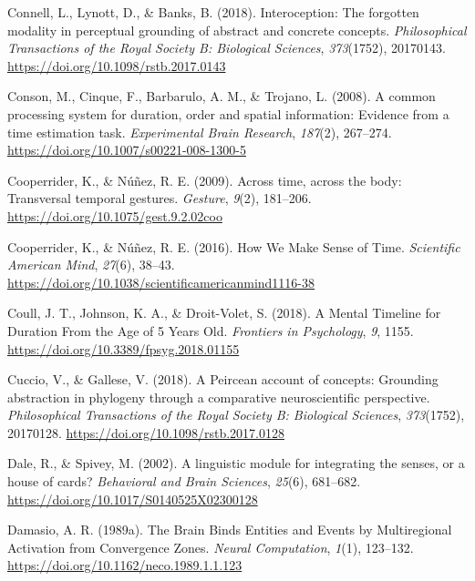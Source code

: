 \documentclass[
  a4paper,12pt,twoside,onecolumn,openright,final,oldfontcommands]{memoir}
\newlength{\cslhangindent}
\newlength{\cslentryspacingunit} %
\newenvironment{CSLReferences}[2] %
 {%
  \setlength{\parindent}{0pt}
  \ifodd #1
  \let\oldpar\par
  \def\par{\hangindent=\cslhangindent\oldpar}
  \fi
  \setlength{\parskip}{#2\cslentryspacingunit}
 }%
 {}
\begin{document}
\begin{CSLReferences}{1}{0}
\leavevmode{}%
Connell, L., Lynott, D., \& Banks, B. (2018). Interoception: The forgotten modality in perceptual grounding of abstract and concrete concepts. \emph{Philosophical Transactions of the Royal Society B: Biological Sciences}, \emph{373}(1752), 20170143. \url{https://doi.org/10.1098/rstb.2017.0143}

\leavevmode{}%
Conson, M., Cinque, F., Barbarulo, A. M., \& Trojano, L. (2008). A common processing system for duration, order and spatial information: Evidence from a time estimation task. \emph{Experimental Brain Research}, \emph{187}(2), 267--274. \url{https://doi.org/10.1007/s00221-008-1300-5}

\leavevmode{}%
Cooperrider, K., \& Núñez, R. E. (2009). Across time, across the body: {Transversal} temporal gestures. \emph{Gesture}, \emph{9}(2), 181--206. \url{https://doi.org/10.1075/gest.9.2.02coo}

\leavevmode{}%
Cooperrider, K., \& Núñez, R. E. (2016). How {We} {Make} {Sense} of {Time}. \emph{Scientific American Mind}, \emph{27}(6), 38--43. \url{https://doi.org/10.1038/scientificamericanmind1116-38}

\leavevmode{}%
Coull, J. T., Johnson, K. A., \& Droit-Volet, S. (2018). A {Mental} {Timeline} for {Duration} {From} the {Age} of 5 {Years} {Old}. \emph{Frontiers in Psychology}, \emph{9}, 1155. \url{https://doi.org/10.3389/fpsyg.2018.01155}

\leavevmode{}%
Cuccio, V., \& Gallese, V. (2018). A {Peircean} account of concepts: Grounding abstraction in phylogeny through a comparative neuroscientific perspective. \emph{Philosophical Transactions of the Royal Society B: Biological Sciences}, \emph{373}(1752), 20170128. \url{https://doi.org/10.1098/rstb.2017.0128}

\leavevmode{}%
Dale, R., \& Spivey, M. (2002). A linguistic module for integrating the senses, or a house of cards? \emph{Behavioral and Brain Sciences}, \emph{25}(6), 681--682. \url{https://doi.org/10.1017/S0140525X02300128}

\leavevmode{}%
Damasio, A. R. (1989a). The {Brain} {Binds} {Entities} and {Events} by {Multiregional} {Activation} from {Convergence} {Zones}. \emph{Neural Computation}, \emph{1}(1), 123--132. \url{https://doi.org/10.1162/neco.1989.1.1.123}


\end{CSLReferences}
\end{document}
